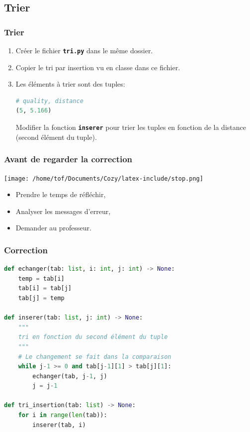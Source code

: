 \documentclass[svgnames,11pt]{beamer}
\begin{document}
\subsection{Trier}
\begin{frame}[fragile]
    \frametitle{Trier}

    \begin{activite}
    \begin{enumerate}
        \item Créer le fichier \textbf{\texttt{tri.py}} dans le même dossier.
        \item Copier le tri par insertion vu en classe dans ce fichier.
        \item Les éléments à trier sont des tuples:
        \begin{lstlisting}[language=Python , basicstyle=\ttfamily\small, xleftmargin=2em, xrightmargin=2em]
# quality, distance
(5, 5.166)
\end{lstlisting}
        Modifier la fonction \textbf{\texttt{inserer}} pour trier les tuples en fonction de la distance (second élément du tuple).
    \end{enumerate}
    \end{activite}

\end{frame}
\begin{frame}
    \frametitle{Avant de regarder la correction}
\begin{center}
    \centering
    \texttt{[image: /home/tof/Documents/Cozy/latex-include/stop.png]}
    \end{center}
{\Large
    \begin{itemize}
        \item Prendre le temps de réfléchir,
        \item Analyser les messages d'erreur,
        \item Demander au professeur.
    \end{itemize}
}
\end{frame}
\begin{frame}[fragile]
    \frametitle{Correction}

\begin{center}
\begin{lstlisting}[language=Python , basicstyle=\ttfamily\small, xleftmargin=0.2em, xrightmargin=0em]
def echanger(tab: list, i: int, j: int) -> None:
    temp = tab[i]
    tab[i] = tab[j]
    tab[j] = temp

def inserer(tab: list, j: int) -> None:
    """
    tri en fonction du second élément du tuple
    """    
    # Le changement se fait dans la comparaison
    while j-1 >= 0 and tab[j-1][1] > tab[j][1]:
        echanger(tab, j-1, j)
        j = j-1

def tri_insertion(tab: list) -> None:
    for i in range(len(tab)):
        inserer(tab, i)
\end{lstlisting}
\end{center}   

\end{frame}
\end{document}

